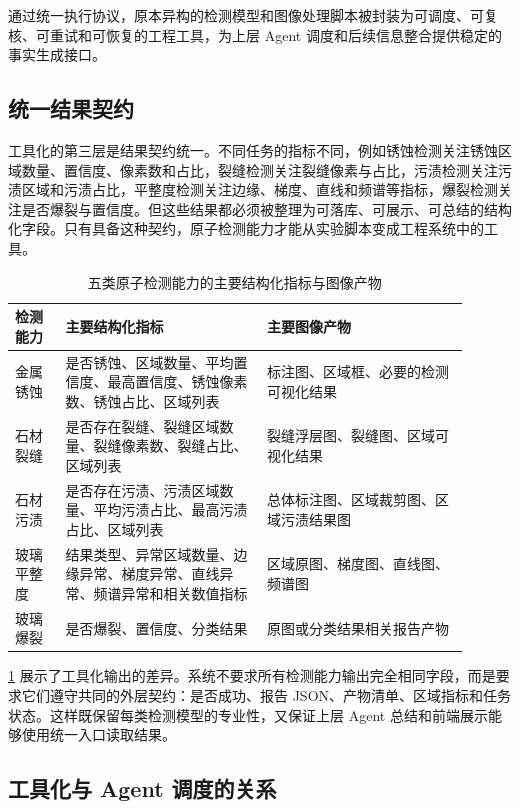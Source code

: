通过统一执行协议，原本异构的检测模型和图像处理脚本被封装为可调度、可复核、可重试和可恢复的工程工具，为上层 Agent 调度和后续信息整合提供稳定的事实生成接口。

\subsection{统一结果契约}
\label{subsec:design-atomic-result-contract}

工具化的第三层是结果契约统一。不同任务的指标不同，例如锈蚀检测关注锈蚀区域数量、置信度、像素数和占比，裂缝检测关注裂缝像素与占比，污渍检测关注污渍区域和污渍占比，平整度检测关注边缘、梯度、直线和频谱等指标，爆裂检测关注是否爆裂与置信度。但这些结果都必须被整理为可落库、可展示、可总结的结构化字段。只有具备这种契约，原子检测能力才能从实验脚本变成工程系统中的工具。

\begin{table}[!htb]
  \caption{五类原子检测能力的主要结构化指标与图像产物}\label{tab:design-atomic-capability-output}
  \centering
  \begin{tabular}{@{}p{0.1\linewidth}p{0.4\linewidth}p{0.4\linewidth}@{}} \toprule
    \textbf{检测能力} & \textbf{主要结构化指标} & \textbf{主要图像产物} \\ \midrule
    金属锈蚀 & 是否锈蚀、区域数量、平均置信度、最高置信度、锈蚀像素数、锈蚀占比、区域列表 & 标注图、区域框、必要的检测可视化结果 \\
    石材裂缝 & 是否存在裂缝、裂缝区域数量、裂缝像素数、裂缝占比、区域列表 & 裂缝浮层图、裂缝图、区域可视化结果 \\
    石材污渍 & 是否存在污渍、污渍区域数量、平均污渍占比、最高污渍占比、区域列表 & 总体标注图、区域裁剪图、区域污渍结果图 \\
    玻璃平整度 & 结果类型、异常区域数量、边缘异常、梯度异常、直线异常、频谱异常和相关数值指标 & 区域原图、梯度图、直线图、频谱图 \\
    玻璃爆裂 & 是否爆裂、置信度、分类结果 & 原图或分类结果相关报告产物 \\ \bottomrule
  \end{tabular}
\end{table}

\cref{tab:design-atomic-capability-output} 展示了工具化输出的差异。系统不要求所有检测能力输出完全相同字段，而是要求它们遵守共同的外层契约：是否成功、报告 JSON、产物清单、区域指标和任务状态。这样既保留每类检测模型的专业性，又保证上层 Agent 总结和前端展示能够使用统一入口读取结果。

\subsection{工具化与 Agent 调度的关系}
\label{subsec:design-tooling-and-agent-routing}

